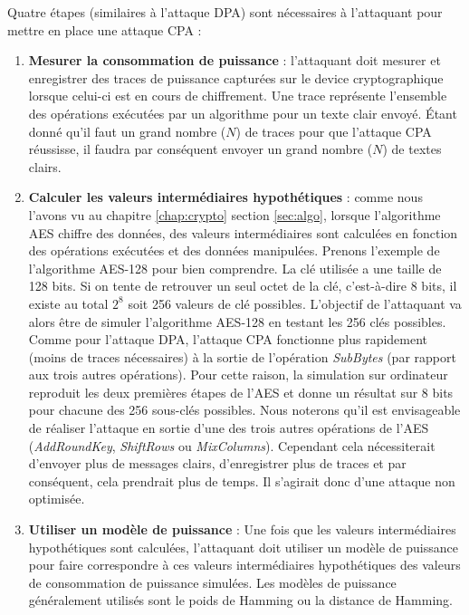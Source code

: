 \documentclass[oneside]{book}
\begin{document}
\newpage

\hspace{-0.5 cm}Quatre étapes (similaires à l'attaque DPA) sont nécessaires à l'attaquant pour mettre en place une attaque CPA : 
\begin{enumerate}
\item \textbf{Mesurer la consommation de puissance} : l'attaquant doit mesurer et enregistrer des traces de puissance capturées sur le device cryptographique lorsque celui-ci est en cours de chiffrement. Une trace représente l'ensemble des opérations exécutées par un algorithme pour un texte clair envoyé. Étant donné qu'il faut un grand nombre ($N$) de traces pour que l'attaque CPA réussisse, il faudra par conséquent envoyer un grand nombre ($N$) de textes clairs.
\item \textbf{Calculer les valeurs intermédiaires hypothétiques} : comme nous l'avons vu au chapitre \ref{chap:crypto} section \ref{sec:algo}, lorsque l'algorithme AES chiffre des données, des valeurs intermédiaires sont calculées en fonction des opérations exécutées et des données manipulées. Prenons l'exemple de l'algorithme AES-128 pour bien comprendre. La clé utilisée a une taille de 128 bits. Si on tente de retrouver un seul octet de la clé, c'est-à-dire 8 bits, il existe au total $2^{8}$ soit 256 valeurs de clé possibles. L'objectif de l'attaquant va alors être de simuler l'algorithme AES-128 en testant les 256 clés possibles. Comme pour l'attaque DPA, l'attaque CPA fonctionne plus rapidement (moins de traces nécessaires) à la sortie de l'opération \textit{SubBytes} (par rapport aux trois autres opérations). Pour cette raison, la simulation sur ordinateur reproduit les deux premières étapes de l’AES et donne un résultat sur 8 bits pour chacune des 256 sous-clés possibles. Nous noterons qu'il est envisageable de réaliser l'attaque en sortie d'une des trois autres opérations de l'AES (\textit{AddRoundKey}, \textit{ShiftRows} ou \textit{MixColumns}). Cependant cela nécessiterait d'envoyer plus de messages clairs, d'enregistrer plus de traces et par conséquent, cela prendrait plus de temps. Il s'agirait donc d'une attaque non optimisée.
\item \textbf{Utiliser un modèle de puissance} : Une fois que les valeurs intermédiaires hypothétiques sont calculées, l'attaquant doit utiliser un modèle de puissance pour faire correspondre à ces valeurs intermédiaires hypothétiques des valeurs de consommation de puissance simulées. Les modèles de puissance généralement utilisés sont le poids de Hamming ou la distance de Hamming.

\end{enumerate}
\end{document}
